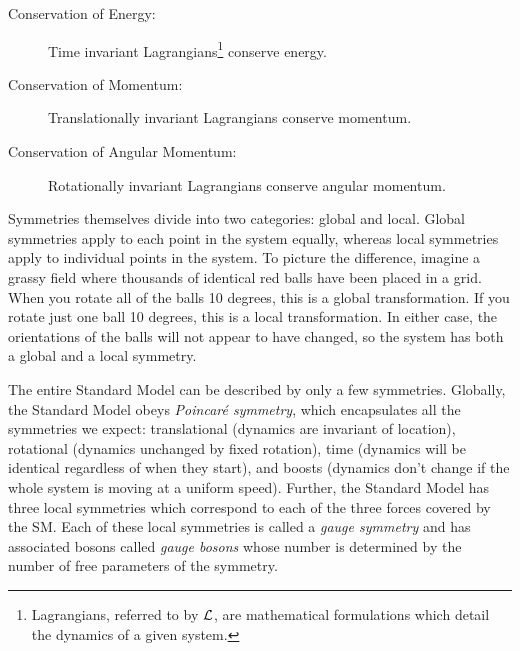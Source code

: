 \begin{description}
\item[Conservation of Energy:]
Time invariant Lagrangians\footnote{Lagrangians, referred to by $\mathcal{L}$, are mathematical formulations which detail the dynamics of a given system.} conserve energy.
\item[Conservation of Momentum:]
Translationally invariant Lagrangians conserve momentum.
\item[Conservation of Angular Momentum:]
Rotationally invariant Lagrangians conserve angular momentum.
\end{description}

Symmetries themselves divide into two categories: global and local. Global symmetries apply to each point in the system equally, whereas local symmetries apply to individual points in the system. To picture the difference, imagine a grassy field where thousands of identical red balls have been placed in a grid. When you rotate all of the balls 10 degrees, this is a global transformation. If you rotate just one ball 10 degrees, this is a local transformation. In either case, the orientations of the balls will not appear to have changed, so the system has both a global and a local symmetry.

The entire Standard Model can be described by only a few symmetries. Globally, the Standard Model obeys \textit{Poincar\'{e} symmetry}, which encapsulates all the symmetries we expect: translational (dynamics are invariant of location), rotational (dynamics unchanged by fixed rotation), time (dynamics will be identical regardless of when they start), and boosts (dynamics don't change if the whole system is moving at a uniform speed). Further, the Standard Model has three local symmetries which correspond to each of the three forces covered by the SM. Each of these local symmetries is called a {\it gauge symmetry} and has associated bosons called {\it gauge bosons} whose number is determined by the number of free parameters of the symmetry.

